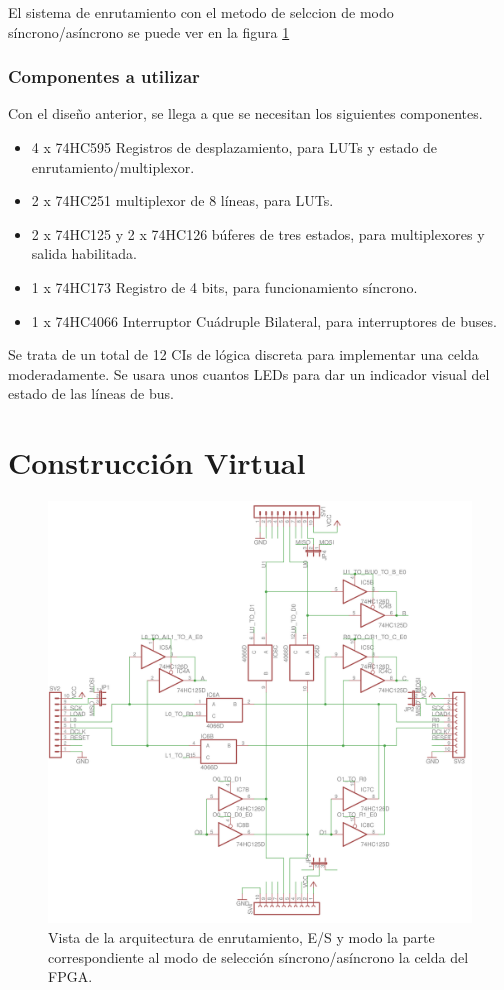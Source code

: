 \documentclass[12pt]{article}
\begin{document}
El sistema de enrutamiento con el metodo de selccion de modo síncrono/asíncrono se puede ver en la figura \ref{fig:7}
\subsubsection{Componentes a utilizar}

Con el diseño anterior, se llega a que se necesitan los siguientes componentes. 
 
\begin{itemize} 
  \item 4 x 74HC595 Registros de desplazamiento, para LUTs y estado de enrutamiento/multiplexor. 
  \item 2 x 74HC251 multiplexor de 8 líneas, para LUTs. 
  \item 2 x 74HC125 y 2 x 74HC126 búferes de tres estados, para multiplexores y salida habilitada. 
  \item 1 x 74HC173 Registro de 4 bits, para funcionamiento síncrono. 
  \item 1 x 74HC4066 Interruptor Cuádruple Bilateral, para interruptores de buses. 
\end{itemize} 
  
Se trata de un total de 12 CIs de lógica discreta para implementar una celda moderadamente. Se usara unos cuantos LEDs para dar un indicador visual del estado de las líneas de bus.

\section{Construcción Virtual}

\begin{figure}[H]
  \centering
  \includegraphics[width=\textwidth]{5-input-output-routing.png}
  \caption{Vista de la arquitectura de enrutamiento, E/S y modo la parte correspondiente al modo de selección síncrono/asíncrono la celda del FPGA.}
  \label{fig:7}
\end{figure}
\end{document}
